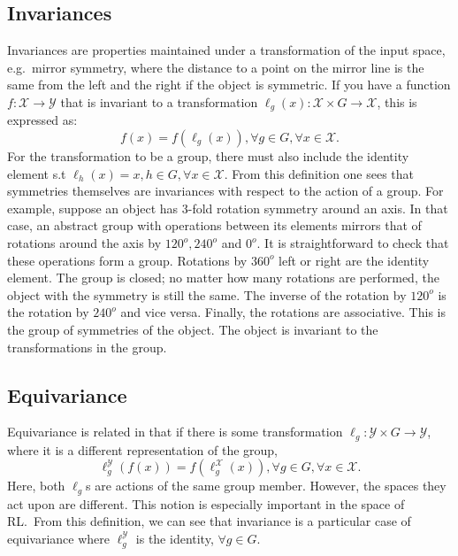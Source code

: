 \subsection{Invariances}
Invariances are properties maintained under a transformation of the input space, e.g.\ mirror symmetry, where the distance to a point on the mirror line is the same from the left and the right if the object is symmetric. If you have a function $f: \mathcal{X} \rightarrow \mathcal{Y}$ that is invariant to a transformation $\ell_g(x): \mathcal{X} \times G \rightarrow \mathcal{X}$, this is expressed as:
\begin{equation}
	f(x) = f(\ell_g(x)),   \forall g \in G, \forall x \in \mathcal{X}.
\end{equation}
For the transformation to be a group, there must also include the identity element s.t $\ell_h(x) = x,  h \in G, \forall x\in \mathcal{X}$. From this definition one sees that symmetries themselves are invariances with respect to the action of a group. For example, suppose an object has 3-fold rotation symmetry around an axis. In that case, an abstract group with operations between its elements mirrors that of rotations around the axis by $120^o, 240^o$ and $0^o$. It is straightforward to check that these operations form a group. Rotations by $360^o$ left or right are the identity element. The group is closed; no matter how many rotations are performed, the object with the symmetry is still the same. The inverse of the rotation by $120^o$ is the rotation by $240^o$ and vice versa. Finally, the rotations are associative. This is the group of symmetries of the object. The object is invariant to the transformations in the group.

\subsection{Equivariance}
Equivariance is related in that if there is some transformation $\ell_g: \mathcal{Y} \times G \rightarrow \mathcal{Y}$, where it is a different representation of the group,
\begin{equation}
	\ell_g^\mathcal{Y}( f(x) )= f(\ell_g^\mathcal{X}( x)), \forall g \in G, \forall x \in \mathcal{X}.
\end{equation}
Here, both $\ell_g$s are actions of the same group member. However, the spaces they act upon are different. This notion is especially important in the space of RL.\ From this definition, we can see that invariance is a particular case of equivariance where $\ell^\mathcal{Y}_g$ is the identity, $\forall g \in G$.
